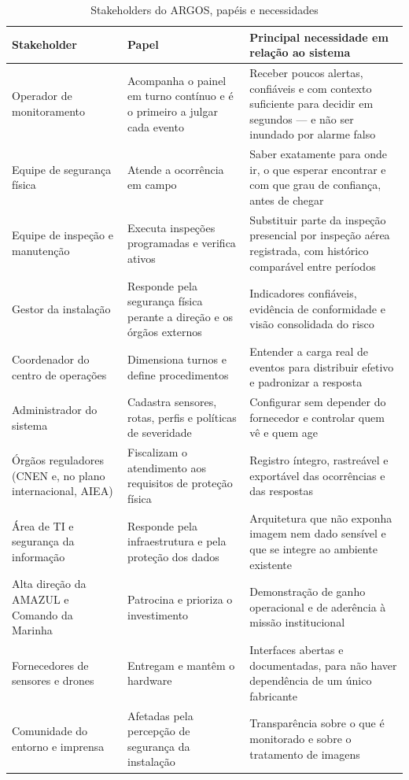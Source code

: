 \documentclass[12pt,a4paper,oneside]{article}
\newcommand{\fonte}[1]{\par\vspace{5pt}{\footnotesize\singlespacing Fonte: #1\par}}
\newcommand{\cab}[1]{\textbf{\footnotesize #1}}
\begin{document}
\begin{table}[H]
\centering
\caption{Stakeholders do ARGOS, papéis e necessidades}
\label{tab:stakeholders}
{\small\singlespacing
\begin{tabularx}{\textwidth}{L{3.4cm} L{4.3cm} X}
\toprule
\cab{Stakeholder} & \cab{Papel} & \cab{Principal necessidade em relação ao
sistema} \\
\midrule
Operador de monitoramento & Acompanha o painel em turno contínuo e é o primeiro
a julgar cada evento & Receber poucos alertas, confiáveis e com contexto
suficiente para decidir em segundos — e não ser inundado por alarme falso \\
\addlinespace
Equipe de segurança física & Atende a ocorrência em campo & Saber exatamente
para onde ir, o que esperar encontrar e com que grau de confiança, antes de
chegar \\
\addlinespace
Equipe de inspeção e manutenção & Executa inspeções programadas e verifica
ativos & Substituir parte da inspeção presencial por inspeção aérea registrada,
com histórico comparável entre períodos \\
\addlinespace
Gestor da instalação & Responde pela segurança física perante a direção e os
órgãos externos & Indicadores confiáveis, evidência de conformidade e visão
consolidada do risco \\
\addlinespace
Coordenador do centro de operações & Dimensiona turnos e define procedimentos &
Entender a carga real de eventos para distribuir efetivo e padronizar a
resposta \\
\addlinespace
Administrador do sistema & Cadastra sensores, rotas, perfis e políticas de
severidade & Configurar sem depender do fornecedor e controlar quem vê e quem
age \\
\addlinespace
Órgãos reguladores (CNEN e, no plano internacional, AIEA) & Fiscalizam o
atendimento aos requisitos de proteção física & Registro íntegro, rastreável e
exportável das ocorrências e das respostas \\
\addlinespace
Área de TI e segurança da informação & Responde pela infraestrutura e pela
proteção dos dados & Arquitetura que não exponha imagem nem dado sensível e que
se integre ao ambiente existente \\
\addlinespace
Alta direção da AMAZUL e Comando da Marinha & Patrocina e prioriza o
investimento & Demonstração de ganho operacional e de aderência à missão
institucional \\
\addlinespace
Fornecedores de sensores e drones & Entregam e mantêm o hardware & Interfaces
abertas e documentadas, para não haver dependência de um único fabricante \\
\addlinespace
Comunidade do entorno e imprensa & Afetadas pela percepção de segurança da
instalação & Transparência sobre o que é monitorado e sobre o tratamento de
imagens \\
\bottomrule
\end{tabularx}}
\fonte{elaborado pelos autores (2026).}
\end{table}
\end{document}
